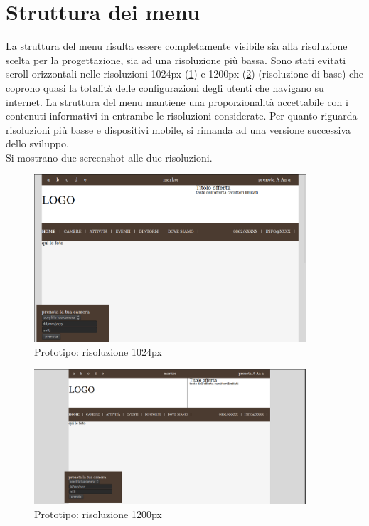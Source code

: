 \documentclass[a4paper,12pt,hidelinks]{report}
\begin{document}
\section*{Struttura dei menu}
La struttura del menu risulta essere completamente visibile sia alla risoluzione scelta per la progettazione, sia ad una risoluzione più bassa.
Sono stati evitati scroll orizzontali nelle risoluzioni 1024px (\ref{fig:nav1024}) e 1200px (\ref{fig:nav1200}) (risoluzione di base) che coprono quasi la totalità 
delle configurazioni degli utenti che navigano su internet.
La struttura del menu mantiene una proporzionalità accettabile con i contenuti informativi in entrambe le risoluzioni considerate. 
Per quanto riguarda risoluzioni più basse e dispositivi mobile, si rimanda ad una versione successiva dello sviluppo.
\\Si mostrano due screenshot alle due risoluzioni.
\begin{figure}[h!]%
    \includegraphics[width=0.9\textwidth,keepaspectratio=true]{../img/nav1024}
    \centering
    \caption{Prototipo: risoluzione 1024px}%
    \label{fig:nav1024}%
\end{figure}

\begin{figure}[h!]%
    \includegraphics[width=0.9\textwidth,keepaspectratio=true]{../img/nav1200}
    \centering
    \caption{Prototipo: risoluzione 1200px}%
    \label{fig:nav1200}%
\end{figure}
\end{document}
